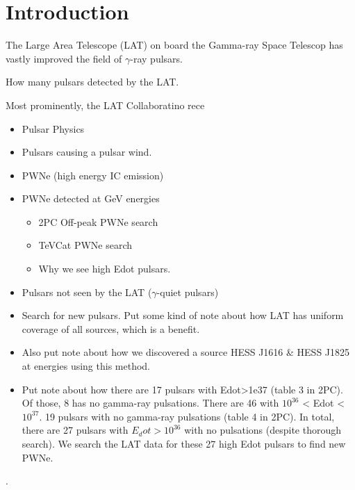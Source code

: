 \section{Introduction}

The Large Area Telescope (LAT) on board the \fermi Gamma-ray Space Telescop has vastly improved
the field of $\gamma$-ray pulsars. 

How many pulsars detected by the LAT.

Most prominently, the LAT Collaboratino rece



\begin{itemize}
  \item Pulsar Physics
  \item Pulsars causing a pulsar wind.
  \item PWNe (high energy IC emission)
  \item PWNe detected at GeV energies
  \begin{itemize}
    \item 2PC Off-peak PWNe search
    \item TeVCat PWNe search
    \item Why we see high Edot pulsars.
  \end{itemize}
  \item Pulsars not seen by the LAT ($\gamma$-quiet pulsars)
  \item Search for new pulsars. Put some kind of note about how LAT has
  uniform coverage of all sources, which is a benefit.
  \item Also put note about how we discovered a source HESS J1616 \&
  HESS J1825 at \gev energies using this method.
\item Put note about how there are 17 pulsars with Edot>1e37 (table 3 in 2PC).
  Of those, 8 has no gamma-ray pulsations. There are 46 with $10^{36}$ < Edot < $10^{37}$.
  19 pulsars with no gamma-ray pulsations (table 4 in 2PC). 
  In total, there are 27 pulsars with $E_dot>10^{36}$ with no pulsations
  (despite thorough search). We search the LAT data for these 27 high Edot pulsars to find
  new PWNe.
\end{itemize}

\citep{LAT_Collaboration_2FGL_2012}.


